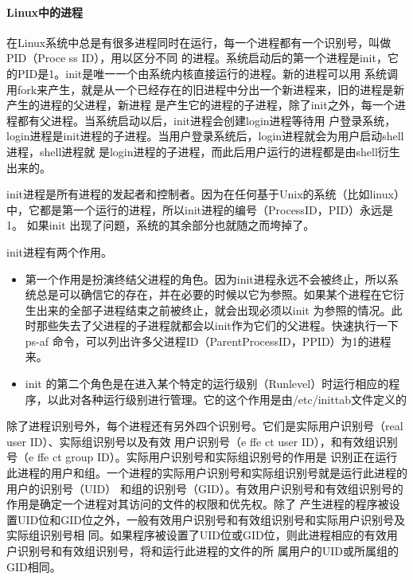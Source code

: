 \documentclass[letterpaper,10pt]{sphinxmanual}
\begin{document}
\paragraph{Linux中的进程}
\label{Linux_pro_mana/process:linux}
在Linux系统中总是有很多进程同时在运行，每一个进程都有一个识别号，叫做PID（Proce ss ID），用以区分不同
的进程。系统启动后的第一个进程是init，它的PID是1。init是唯一一个由系统内核直接运行的进程。新的进程可以用
系统调用fork来产生，就是从一个已经存在的旧进程中分出一个新进程来，旧的进程是新产生的进程的父进程，新进程
是产生它的进程的子进程，除了init之外，每一个进程都有父进程。当系统启动以后，init进程会创建login进程等待用
户登录系统，login进程是init进程的子进程。当用户登录系统后，login进程就会为用户启动shell进程，shell进程就
是login进程的子进程，而此后用户运行的进程都是由shell衍生出来的。

init进程是所有进程的发起者和控制者。因为在任何基于Unix的系统（比如linux）中，它都是第一个运行的进程，所以init进程的编号（ProcessID，PID）永远是1。
如果init 出现了问题，系统的其余部分也就随之而垮掉了。

init进程有两个作用。
\begin{itemize}
\item {} 
第一个作用是扮演终结父进程的角色。因为init进程永远不会被终止，所以系统总是可以确信它的存在，并在必要的时候以它为参照。如果某个进程在它衍生出来的全部子进程结束之前被终止，就会出现必须以init 为参照的情况。此时那些失去了父进程的子进程就都会以init作为它们的父进程。快速执行一下ps-af 命令，可以列出许多父进程ID（ParentProcessID，PPID）为1的进程来。

\item {} 
init 的第二个角色是在进入某个特定的运行级别（Runlevel）时运行相应的程序，以此对各种运行级别进行管理。它的这个作用是由/etc/inittab文件定义的

\end{itemize}

除了进程识别号外，每个进程还有另外四个识别号。它们是实际用户识别号（real user ID）、实际组识别号以及有效
用户识别号（e ffe ct user ID），和有效组识别号（e ffe ct group ID）。实际用户识别号和实际组识别号的作用是
识别正在运行此进程的用户和组。一个进程的实际用户识别号和实际组识别号就是运行此进程的用户的识别号（UID）
和组的识别号（GID）。有效用户识别号和有效组识别号的作用是确定一个进程对其访问的文件的权限和优先权。除了
产生进程的程序被设置UID位和GID位之外，一般有效用户识别号和有效组识别号和实际用户识别号及实际组识别号相
同。如果程序被设置了UID位或GID位，则此进程相应的有效用户识别号和有效组识别号，将和运行此进程的文件的所
属用户的UID或所属组的GID相同。
\end{document}
